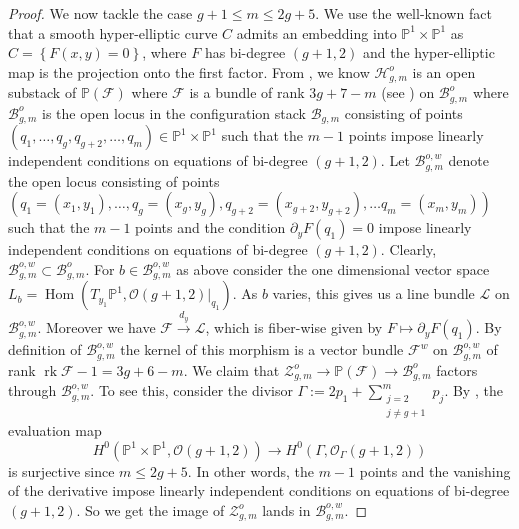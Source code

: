 \documentclass[11pt]{amsart}
\theoremstyle{definition}
\begin{document}
\begin{proof}
\noindent We now tackle the case $g+1\leq m \leq 2g+5$. We use the well-known fact that a smooth hyper-elliptic curve $C$ admits an embedding  into $\mathbb P^1\times \mathbb P^1$ as $C= \left \{ F(x,y) =0 \right \}$, where $F$ has bi-degree $(g+1,2)$ and the hyper-elliptic map is the projection onto the first factor. From \cite{cl-hyp}, we know $\mathcal H^o_{g,m}$ is an open substack of $\mathbb P(\mathcal F)$ where $\mathcal F$ is a bundle of rank $3g+7-m$ (see \cite[Equation 4.11]{cl-hyp}) on $\mathcal B^o_{g,m}$ where $\mathcal B^o_{g,m}$ is the open locus in the configuration stack $\mathcal B_{g,m}$ consisting of points $(q_1,\dots, q_g, q_{g+2},\dots,q_{m})\in \mathbb P^1\times \mathbb P^1$ such that the $m-1$ points impose linearly independent conditions on equations of bi-degree $(g+1,2)$. Let $\mathcal B^{o,w}_{g,m}$ denote the open locus consisting of points $(q_1=(x_1,y_1),\dots ,q_g=(x_g,y_g), q_{g+2}=(x_{g+2},y_{g+2}),\dots q_m =(x_m,y_m))$ such that the $m-1$ points and the condition $\partial_y F(q_1)=0$ impose  linearly independent conditions on equations of bi-degree $(g+1,2)$. Clearly, $\mathcal B^{o,w}_{g,m} \subset \mathcal B^{o}_{g,m}$. For $b\in \mathcal B^{o,w}_{g,m}$ as above consider the one dimensional vector space $L_b=\operatorname{Hom} \left (T_{y_1}\mathbb P^1, \mathcal O(g+1,2)|_{q_1} \right )$. As $b$ varies, this gives us a line bundle $\mathcal L$ on $\mathcal B^{o,w}_{g,m}$.  Moreover we have $\mathcal F \xrightarrow{d_y} \mathcal L$, which is fiber-wise given by $F\mapsto \partial_y F(q_1)$. By definition of $\mathcal B^{o,w}_{g,m}$ the kernel of this morphism is a vector bundle $\mathcal F^w$ on $\mathcal B^{o,w}_{g,m}$ of rank $\operatorname{rk}\mathcal F-1=3g+6-m$. We claim that $\mathcal Z^o_{g,m} \rightarrow \mathbb P(\mathcal F) \rightarrow \mathcal B^o_{g,m}$ factors through $\mathcal B^{o,w}_{g,m}$. To see this, consider the divisor $\displaystyle{\Gamma:=2p_1 +\sum_{\substack{j=2 \\ j\neq g+1}}^m p_j}$. By \cite[Lemma 4.2]{cl-hyp}, the evaluation map \begin{equation*}
    H^0(\mathbb P^1\times \mathbb P^1 , \mathcal O(g+1,2)) \rightarrow H^0( \Gamma, \mathcal O_{\Gamma}(g+1,2) ) 
\end{equation*}is surjective since $m\leq 2g+5$. In other words, the $m-1$ points and the vanishing of the derivative impose linearly independent conditions on equations of bi-degree $(g+1,2)$. So we get the image of $\mathcal Z^o_{g,m}$ lands in $\mathcal B^{o,w}_{g,m}$. 


\end{proof}
\end{document}
